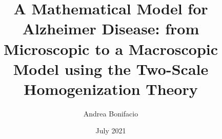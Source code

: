 \documentclass{beamer}
\title{A Mathematical Model for Alzheimer Disease: from Microscopic to a Macroscopic Model using the Two-Scale Homogenization Theory}
\author{Andrea Bonifacio}
\date{July 2021}
\begin{document}
\begin{frame}[plain]
\titlepage
\end{frame}
\end{document}
